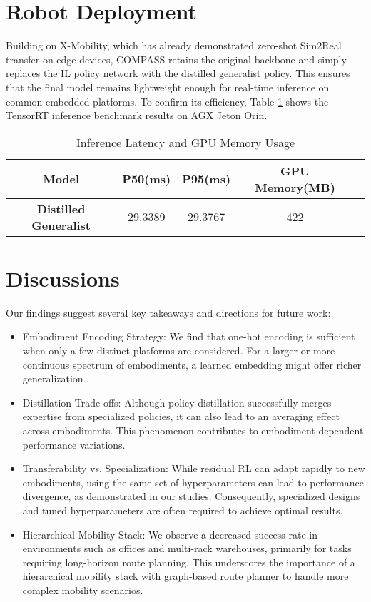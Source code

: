 \documentclass[letterpaper, 10 pt,conference]{ieeeconf}
\begin{document}
\section{Robot Deployment}
Building on X-Mobility, which has already demonstrated zero-shot Sim2Real transfer on edge devices, COMPASS retains the original backbone and simply replaces the IL policy network with the distilled generalist policy. This ensures that the final model remains lightweight enough for real-time inference on common embedded platforms. To confirm its efficiency, Table \ref{tab:trt_run_time} shows the TensorRT inference benchmark results on AGX Jeton Orin.

\begin{table}[t]
\centering
\caption{Inference Latency and GPU Memory Usage}
\begin{tabular}{c c c c c}
\toprule
\textbf{Model} & \textbf{P50(ms)} & \textbf{P95(ms)} & \textbf{GPU Memory(MB)} \\ 
\midrule
\textbf{Distilled Generalist} & 29.3389 & 29.3767 & 422 \\ 
\bottomrule
\end{tabular}
\label{tab:trt_run_time}
\end{table}

\section{Discussions}
Our findings suggest several key takeaways and directions for future work:
\begin{itemize}
    \item Embodiment Encoding Strategy: We find that one-hot encoding is sufficient when only a few distinct platforms are considered. For a larger or more continuous spectrum of embodiments, a learned embedding might offer richer generalization \cite{johannemann2021sufficientrepresentationscategoricalvariables}.
    \item Distillation Trade-offs: Although policy distillation successfully merges expertise from specialized policies, it can also lead to an averaging effect across embodiments. This phenomenon contributes to embodiment-dependent performance variations.
    \item Transferability vs. Specialization: While residual RL can adapt rapidly to new embodiments, using the same set of hyperparameters can lead to performance divergence, as demonstrated in our studies. Consequently, specialized designs and tuned hyperparameters are often required to achieve optimal results.
    \item Hierarchical Mobility Stack: We observe a decreased success rate in environments such as offices and multi-rack warehouses, primarily for tasks requiring long-horizon route planning. This underscores the importance of a hierarchical mobility stack with graph-based route planner to handle more complex mobility scenarios.
\end{itemize}
\end{document}
